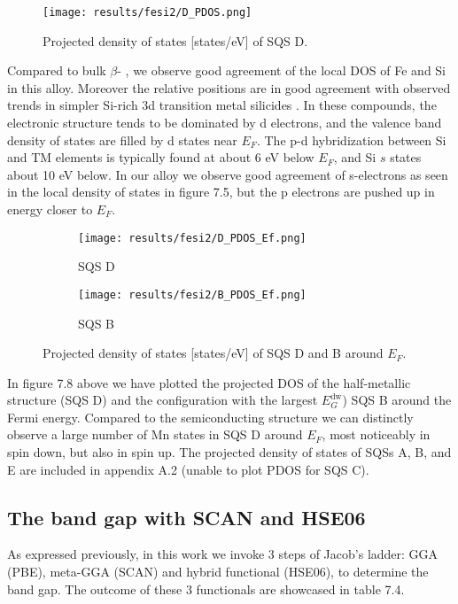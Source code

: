 \begin{figure}[H]
	\centering
	\texttt{[image: results/fesi2/D\_PDOS.png]}
	\caption{Projected density of states [states/eV] of SQS D.}
\end{figure} 

Compared to bulk $\beta$- \cite{doi:10.1063/1.346415}, we observe good agreement of the local DOS of Fe and Si in this alloy. Moreover the relative positions are in good agreement with observed trends in simpler Si-rich 3d transition metal silicides \cite{lange1997electronic}. In these compounds, the electronic structure tends to be dominated by d electrons, and the valence band density of states are filled by d states near $E_F$. The p-d hybridization between Si and TM elements is typically found at about 6 eV below $E_F$, and Si $s$ states about 10 eV below. In our alloy we observe good agreement of s-electrons as seen in the local density of states in figure 7.5, but the p electrons are pushed up in energy closer to $E_F$. 

\begin{figure}[H]
	\begin{subfigure}{.5\textwidth}
			\texttt{[image: results/fesi2/D\_PDOS\_Ef.png]}
			\caption{SQS D}		
	\end{subfigure}
	\begin{subfigure}{.5\textwidth}
		\texttt{[image: results/fesi2/B\_PDOS\_Ef.png]}
		\caption{SQS B}		
	\end{subfigure}
	\caption{Projected density of states [states/eV] of SQS D and B around $E_F$.}
\end{figure}

In figure 7.8 above we have plotted the projected DOS of the half-metallic structure (SQS D) and the configuration with the largest $E_G ^\text{dw}$) SQS B around the Fermi energy. Compared to the semiconducting structure we can distinctly observe a large number of Mn states in SQS D around $E_F$, most noticeably in spin down, but also in spin up. The projected density of states of SQSs A, B, and E are included in appendix A.2 (unable to plot PDOS for SQS C).

\subsection{The band gap with SCAN and HSE06}
As expressed previously, in this work we invoke 3 steps of Jacob's ladder: GGA (PBE), meta-GGA (SCAN) and hybrid functional (HSE06), to determine the band gap. The outcome of these 3 functionals are showcased in table 7.4.

